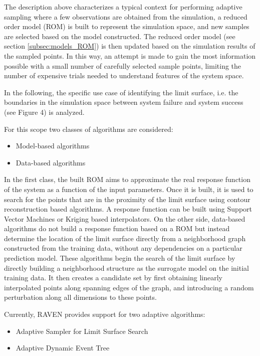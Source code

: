 The description above characterizes a typical context for performing adaptive
sampling where a few observations are obtained from the simulation, a reduced
order model (ROM) is built to represent the simulation space, and new samples
are selected based on the model constructed.
%
The reduced order model (see section \ref{subsec:models_ROM}) is then updated
based on the simulation results of the sampled points.
%
In this way, an attempt is made to gain the most information possible with a
small number of carefully selected sample points, limiting the number of
expensive trials needed to understand features of the system space.
%

In the following, the specific use case of identifying the limit surface, i.e.
the boundaries in the simulation space between system failure and system success
(see Figure 4) is analyzed.

For this scope two classes of algorithms are considered:
\begin{itemize}
  \item Model-based algorithms
  \item Data-based algorithms
\end{itemize}

In the first class, the built ROM aims to approximate the real response function
of the system as a function of the input parameters.
%
Once it is built, it is used to search for the points that are in the proximity
of the limit surface using contour reconstruction based algorithms.
%
A response function can be built using Support Vector Machines or Kriging based
interpolators.
%
On the other side, data-based algorithms do not build a response function based
on a ROM but instead determine the location of the limit surface directly from
a neighborhood graph constructed from the training data, without any
dependencies on a particular prediction model.
%
These algorithms begin the search of the limit surface by directly building a
neighborhood structure as the surrogate model on the initial training data.
%
It then creates a candidate set by first obtaining linearly interpolated points
along spanning edges of the graph, and introducing a random perturbation along
all dimensions to these points.

Currently, RAVEN provides support for two adaptive algorithms:

\begin{itemize}
  \item Adaptive Sampler for Limit Surface Search
  \item Adaptive Dynamic Event Tree
\end{itemize}

